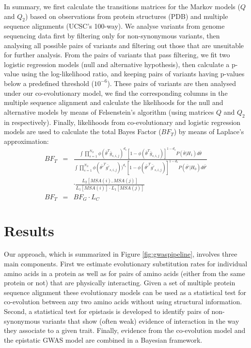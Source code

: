 In summary, we first calculate the transitions matrices for the Markov models ($Q$ and $Q_2$) based on observations from protein structures (PDB) and multiple sequence alignments (UCSC's 100-way). 
We analyse variants from genome sequencing data first by filtering only for non-synonymous variants, then analysing all possible pairs of variants and filtering out those that are unsuitable for further analysis.
From the pairs of variants that pass filtering, we fit two logistic regression models (null and alternative hypothesis), then calculate a p-value using the log-likelihood ratio, and keeping pairs of variants having p-values below a predefined threshold ($10^{-6}$). 
These pairs of variants are then analysed under our co-evolutionary model, we find the corresponding columns in the multiple sequence alignment and calculate the likelihoods for the null and alternative models by means of Felsenstein's algorithm (using matrices $Q$ and $Q_2$ in respectively). 
Finally, likelihoods from co-evolutionary and logistic regression models are used to calculate the total Bayes Factor ($BF_T$) by means of Laplace's approximation:
\begin{eqnarray*}\label{eq:bftot}
	BF_T & = & \frac
	{ \int{ \prod_{s=1}^{N_S}{ \phi( \bar{\theta}^T \bar{g}_{s,i,j})^{d_s} [ 1-\phi( \bar{\theta}^T \bar{g}_{s,i,j}) ]^{1-d_s} } P( \bar{\theta} | H_1)  d\bar{\theta} } }
	{ \int{ \prod_{s=1}^{N_S}{ 
	\phi( \bar{\theta'}^T \bar{g'}_{s,i,j} ) )^{d_s} 
	[ 1-\phi( \bar{\theta'}^T \bar{g'}_{s,i,j}) ]^{1-d_s} } 
	P( \bar{\theta'} | H_0)  
	d\bar{\theta'} } } \\
	& & \cdot \frac{L_2[ MSA(i), MSA(j) ]}{L_1[MSA(i)] \cdot L_1[MSA(j)]} \\
	BF_T & = & BF_G \cdot L_C
\end{eqnarray*}

\section{Results}

Our approach, which is summarized in Figure \ref{fig:gwaspipeline}, involves three main components. 
First we estimate evolutionary substitution rates for individual amino acids in a protein as well as for pairs of amino acids (either from the same protein or not) that are physically interacting.
Given a set of multiple protein sequence alignment these evolutionary models can be used as a statistical test for co-evolution between any two amino acids without using structural information. 
Second, a statistical test for epistasis is developed to identify pairs of non-synonymous variants that show (often weak) evidence of interaction in the way they associate to a given trait. 
Finally, evidence from the co-evolution model and the epistatic GWAS model are combined in a Bayesian framework.
 

